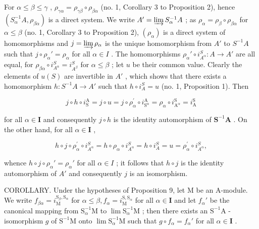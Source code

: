 For \(\alpha \leqslant \beta \leqslant \gamma\) , \(\rho_{\gamma \alpha} = \rho_{\gamma \beta} \circ \rho_{\beta \alpha}\) (no. 1, Corollary 3 to Proposition 2), hence \((S_{\alpha}^{-1}A, \rho_{\beta \alpha})\) is a direct system. We write \(A' = \varinjlim S_{\alpha}^{-1}A\) ; as \(\rho_{\alpha} = \rho_{\beta} \circ \rho_{\beta \alpha}\) for \(\alpha \leqslant \beta\) (no. 1, Corollary 3 to Proposition 2), \((\rho_{\alpha})\) is a direct system of homomorphisms and \(j = \varinjlim \rho_{\alpha}\) is the unique homomorphism from \(A'\) to \(S^{-1}A\) such that \(j \circ \rho_{\alpha}' = \rho_{\alpha}\) for all \(\alpha \in I\) . The homomorphisms \(\rho_{\alpha}' \circ i_{A^{\alpha}}^{S}: A \to A'\) are all equal, for \(\rho_{\beta \alpha} \circ i_{A^{\alpha}}^{S} = i_{A^{\beta}}^{S}\) for \(\alpha \leqslant \beta\) ; let \(u\) be their common value. Clearly the elements of \(u(S)\) are invertible in \(A'\) , which shows that there exists a homomorphism \(h: S^{-1}A \to A'\) such that \(h \circ i_{A}^{S} = u\) (no. 1, Proposition 1). Then

\[
j \circ h \circ i _ {\mathrm{S}} ^ {\mathrm{A}} = j \circ u = j \circ \rho_ {\alpha} ^ {\prime} \circ i _ {\mathrm{S} ^ {\alpha}} ^ {\mathrm{A}} = \rho_ {\alpha} \circ i _ {\mathrm{A} ^ {\alpha}} ^ {\mathrm{S}} = i _ {\mathrm{A}} ^ {\mathrm{S}}
\]

for all \(\alpha \in \mathbf{I}\) and consequently \(j \circ h\) is the identity automorphism of \(\mathbf{S}^{-1}\mathbf{A}\) . On the other hand, for all \(\alpha \in \mathbf{I}\) ,

\[
h \circ j \circ \rho_ {\alpha} ^ {\prime} \circ i _ {A ^ {\alpha}} ^ {S} = h \circ \rho_ {\alpha} \circ i _ {A ^ {\alpha}} ^ {S} = h \circ i _ {A} ^ {S} = u = \rho_ {\alpha} ^ {\prime} \circ i _ {A ^ {\alpha}} ^ {S},
\]

whence \(h \circ j \circ \rho_{\alpha}' = \rho_{\alpha}'\) for all \(\alpha \in I\) ; it follows that \(h \circ j\) is the identity automorphism of \(A'\) and consequently \(j\) is an isomorphism.

COROLLARY. Under the hypotheses of Proposition 9, let M be an A-module. We write \(f_{\beta \alpha} = i_{\mathrm{M}}^{\mathrm{S}_{\beta},\mathrm{S}_{\alpha}}\) for \(\alpha \leqslant \beta, f_{\alpha} = i_{\mathrm{M}}^{\mathrm{S},\mathrm{S}_{\alpha}}\) for all \(\alpha \in \mathbf{I}\) and let \(f_{\alpha}'\) be the canonical mapping from \(\mathrm{S}_{\alpha}^{-1}\mathrm{M}\) to \(\lim \mathrm{S}_{\alpha}^{-1}\mathrm{M}\) ; then there exists an \(\mathrm{S}^{-1}\mathrm{A}\) -isomorphism \(g\) of \(\mathrm{S}^{-1}\mathrm{M}\) onto \(\lim \mathrm{S}_{\alpha}^{-1}\mathrm{M}\) such that \(g \circ f_{\alpha} = f_{\alpha}'\) for all \(\alpha \in \mathbf{I}\) .

